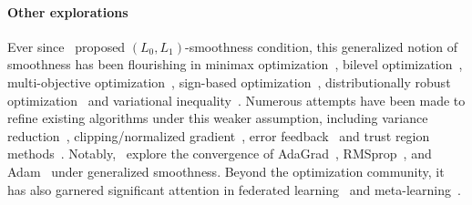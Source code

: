 \paragraph{Other explorations}
Ever since~\citet{Zhang2020Why} proposed $(L_0,L_1)$-smoothness condition, this generalized notion of smoothness has been flourishing in minimax optimization~\citep{pmlr-v235-xian24a}, bilevel optimization~\citep{hao2024bilevel,pmlr-v235-gong24d}, multi-objective optimization~\citep{zhang2024MOO}, sign-based optimization~\citep{crawshaw2022robustness}, distributionally robust optimization~\citep{jin2021nonconvexdro} and variational inequality~\citep{vankov2024adaptive,vankov2024generalized}. Numerous attempts have been made to refine existing algorithms under this weaker assumption, including variance reduction~\citep{reisizadeh2023variance}, clipping/normalized gradient~\citep{zhang2020improved,pmlr-v130-qian21a,DBLP:journals/chinaf/ZhaoXL21,pmlr-v238-hubler24a,yang2024independently}, error feedback~\citep{khirirat2024error} and trust region methods~\citep{Xie2024trustregion}. Notably,~\citet{pmlr-v178-faw22a,pmlr-v195-faw23a,pmlr-v195-wang23a,Li23adam,wang2024provable,zhang2024gs} explore the convergence of AdaGrad~\citep{JMLR:v12:duchi11a}, RMSprop~\citep{hinton2012neural}, and Adam~\citep{kingma15adam} under generalized smoothness. Beyond the optimization community, it has also garnered significant attention in federated learning~\citep{khirirat2024communication,demidovich2024methods} and meta-learning~\citep{chayti2024metalearning}.

